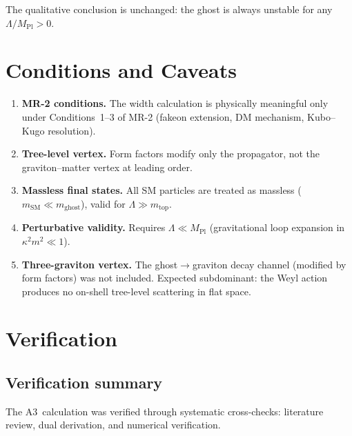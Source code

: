 \documentclass[11pt,a4paper]{article}
\newcommand{\MPl}{M_{\mathrm{Pl}}}
\begin{document}
\noindent
The qualitative conclusion is unchanged: the ghost is always unstable
for any $\Lambda/\MPl > 0$.


\section{Conditions and Caveats}
\label{sec:caveats}

\begin{enumerate}
  \item \textbf{MR-2 conditions.}
    The width calculation is physically meaningful only under
    Conditions~1--3 of MR-2 (fakeon extension, DM mechanism, Kubo--Kugo
    resolution).

  \item \textbf{Tree-level vertex.}
    Form factors modify only the propagator, not the graviton--matter
    vertex at leading order.

  \item \textbf{Massless final states.}
    All SM particles are treated as massless ($m_{\mathrm{SM}} \ll
    m_{\mathrm{ghost}}$), valid for $\Lambda \gg m_{\mathrm{top}}$.

  \item \textbf{Perturbative validity.}
    Requires $\Lambda \ll \MPl$ (gravitational loop expansion in
    $\kappa^2 m^2 \ll 1$).

  \item \textbf{Three-graviton vertex.}
    The ghost$\to$graviton decay channel (modified by form factors)
    was not included.  Expected subdominant: the Weyl action produces
    no on-shell tree-level scattering in flat space.
\end{enumerate}


\section{Verification}
\label{sec:verification}

\subsection{Verification summary}

The A3~calculation was verified through systematic cross-checks:
literature review, dual derivation, and numerical verification.
\end{document}
